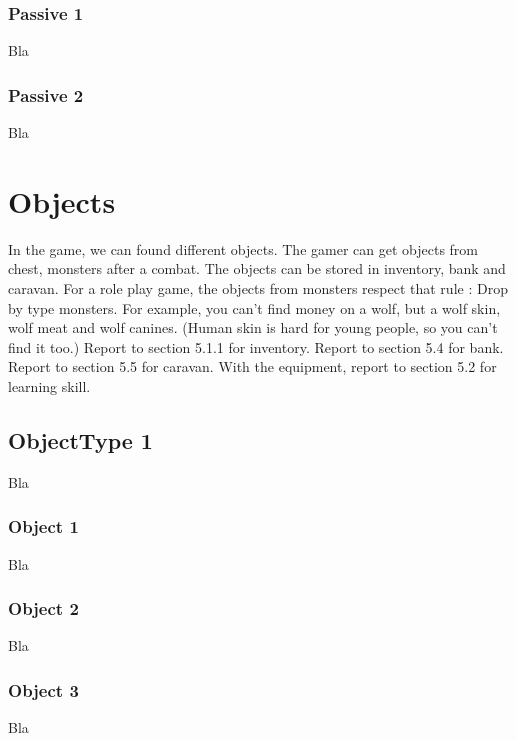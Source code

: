 \documentclass[a4paper,12pt]{book}
\begin{document}
\subsubsection{Passive 1}
Bla
\subsubsection{Passive 2}
Bla
\section{Objects}
In the game, we can found different objects. The gamer can get objects from chest, monsters after a combat. The objects can be stored in inventory, bank and caravan.
For a role play game, the objects from monsters respect that rule : Drop by type monsters. For example, you can't find money on a wolf, but a wolf skin, wolf meat and wolf canines. (Human skin is hard for young people, so you can't find it too.)
Report to section 5.1.1 for inventory.
Report to section 5.4 for bank.
Report to section 5.5 for caravan.
With the equipment, report to section 5.2 for learning skill.
\subsection{ObjectType 1}
Bla
\subsubsection{Object 1}
Bla
\subsubsection{Object 2}
Bla
\subsubsection{Object 3}
Bla
\end{document}
